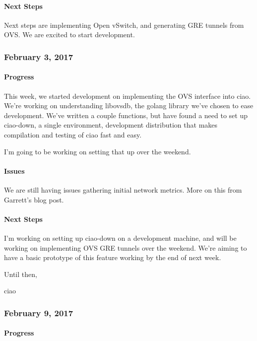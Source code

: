 \documentclass[10pt,onecolumn,journal,draftclsnofoot]{IEEEtran}
\begin{document}
\paragraph{Next Steps} 

Next steps are implementing Open vSwitch, and generating GRE tunnels
from OVS. We are excited to start development.

\subsubsection{February 3, 2017} 

\paragraph{Progress} 

This week, we started development on implementing the OVS interface into
ciao. We're working on understanding libovsdb, the golang library we've
chosen to ease development. We've written a couple functions, but have
found a need to set up ciao-down, a single environment, development
distribution that makes compilation and testing of ciao fast and easy.

I'm going to be working on setting that up over the weekend.

\paragraph{Issues} 

We are still having issues gathering initial network metrics. More on
this from Garrett's blog post.

\paragraph{Next Steps} 

I'm working on setting up ciao-down on a development machine, and will
be working on implementing OVS GRE tunnels over the weekend. We're
aiming to have a basic prototype of this feature working by the end of
next week.

Until then,

ciao

\subsubsection{February 9, 2017} 

\paragraph{Progress} 
\end{document}
